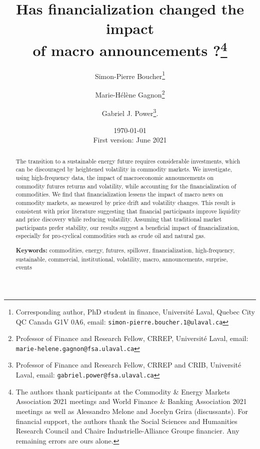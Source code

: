 \documentclass[12pt]{article}
\title{\textbf{Has financialization changed the impact\\ of macro announcements ?}\thanks{The authors thank participants at the Commodity \& Energy Markets Association 2021 meetings and World Finance \& Banking Association 2021 meetings as well as Alessandro Melone and Jocelyn Grira (discussants). For financial support, the authors thank the Social Sciences and Humanities Research Council and Chaire Industrielle-Alliance Groupe financier. Any remaining errors are ours alone.}}
\author{Simon-Pierre Boucher\footnote{Corresponding author, PhD student in finance, Université Laval, Quebec City QC Canada G1V 0A6, email:   \texttt{simon-pierre.boucher.1@ulaval.ca}}\and Marie-H{\'e}l{\`e}ne Gagnon\footnote{Professor of Finance and Research Fellow, CRREP, Université Laval, email: \texttt{marie-helene.gagnon@fsa.ulaval.ca}}\and Gabriel J. Power\footnote{Professor of Finance and Research Fellow, CRREP and CRIB, Université Laval, email:   \texttt{gabriel.power@fsa.ulaval.ca}}. 
}
\date{ \today \\ First version: June 2021}
\begin{document}
\begin{titlepage}
\maketitle





\begin{abstract}
\noindent 
\singlespacing
The transition to a sustainable energy future requires considerable investments, which can be discouraged by heightened volatility in commodity markets.
 We investigate, using high-frequency data, the impact of macroeconomic announcements on commodity futures returns and volatility, while accounting for the financialization of commodities. We find that financialization lessens the impact of macro news on commodity markets, as measured by price drift and volatility changes. This result is consistent with prior literature suggesting that financial participants improve liquidity and price discovery while reducing volatility. Assuming that traditional market participants prefer stability, our results suggest a beneficial impact of financialization, especially for pro-cyclical commodities such as crude oil and natural gas.

\vspace{0.2in}
\noindent\textbf{Keywords:} commodities, energy, futures,  spillover, financialization, high-frequency, sustainable, commercial, institutional, volatility, macro, announcements, surprise, events\\


\bigskip
\end{abstract}
\setcounter{page}{0}
\thispagestyle{empty}
\end{titlepage}
\pagebreak \newpage




\doublespacing
\end{document}
